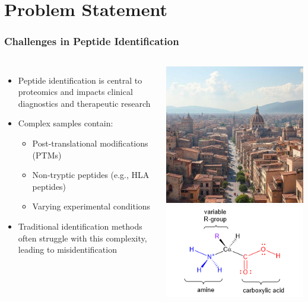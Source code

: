 \documentclass{beamer}
\begin{document}
\section{Problem Statement}
\begin{frame}
  \frametitle{Challenges in Peptide Identification}
  \begin{columns}
      \begin{itemize}
        \item Peptide identification is central to proteomics and impacts clinical diagnostics and therapeutic research
        \item Complex samples contain:
        \begin{itemize}
          \item Post-translational modifications (PTMs)
          \item Non-tryptic peptides (e.g., HLA peptides)
          \item Varying experimental conditions
        \end{itemize}
        \item Traditional identification methods often struggle with this complexity, leading to misidentification
      \end{itemize}
      \includegraphics[width=0.9\linewidth]{reports/image1.jpeg}\\[1em]
      \includegraphics[width=0.9\linewidth]{reports/peptide.png}

\end{columns}
\end{frame}
\end{document}

